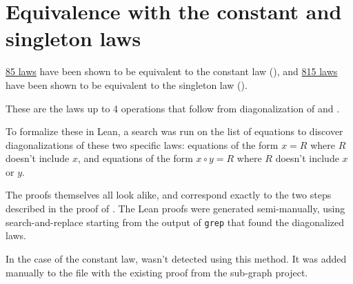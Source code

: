 \chapter{Equivalence with the constant and singleton laws}\label{constant-chapter}

\href{https://github.com/teorth/equational_theories/blob/main/equational_theories/Generated/Constant.lean}{85 laws}
have been shown to be equivalent to the constant law (), and
\href{https://github.com/teorth/equational_theories/blob/main/equational_theories/Generated/Singleton.lean}{815 laws}
have been shown to be equivalent to the singleton law ().

These are the laws up to 4 operations that follow from diagonalization of  and .

To formalize these in Lean, a search was run on the list of equations to discover
diagonalizations of these two specific laws: equations of the form $x = R$ where $R$ doesn't include
$x$, and equations of the form $x \circ y = R$ where $R$ doesn't include $x$ or $y$.

The proofs themselves all look alike, and correspond exactly to the two steps described in the proof
of . The Lean proofs were generated semi-manually, using search-and-replace starting from
the output of \texttt{grep} that found the diagonalized laws.

In the case of the constant law,  wasn't detected using
this method. It was added manually to the file with the existing proof from the sub-graph project.
